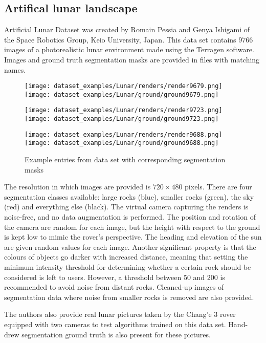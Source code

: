 \documentclass[a4paper,twoside,12pt]{book}
\begin{document}
\subsection{Artifical lunar landscape}
Artificial Lunar Dataset was created by Romain Pessia and Genya Ishigami of the Space Robotics Group, Keio University, Japan. This data set contains 9766 images of a photorealistic lunar environment made using the Terragen software. Images and ground truth segmentation masks are provided in files with matching names.

\begin{figure}[h!]
    \centering
    \texttt{[image: dataset\_examples/Lunar/renders/render9679.png]}
    \texttt{[image: dataset\_examples/Lunar/ground/ground9679.png]}

    \texttt{[image: dataset\_examples/Lunar/renders/render9723.png]}
    \texttt{[image: dataset\_examples/Lunar/ground/ground9723.png]}

    \texttt{[image: dataset\_examples/Lunar/renders/render9688.png]}
    \texttt{[image: dataset\_examples/Lunar/ground/ground9688.png]}
    \caption{Example entries from data set with corresponding segmentation masks}
    \label{fig:data_example1}
\end{figure}

The resolution in which images are provided is $720 \times 480$ pixels. There are four segmentation classes available: large rocks (blue), smaller rocks (green), the sky (red) and everything else (black). The virtual camera capturing the renders is noise-free, and no data augmentation is performed. The position and rotation of the camera are random for each image, but the height with respect to the ground is kept low to mimic the rover's perspective. The heading and elevation of the sun are given random values for each image. Another significant property is that the colours of objects go darker with increased distance, meaning that setting the minimum intensity threshold for determining whether a certain rock should be considered is left to users. However, a threshold between 50 and 200 is recommended to avoid noise from distant rocks. Cleaned-up images of segmentation data where noise from smaller rocks is removed are also provided.

The authors also provide real lunar pictures taken by the Chang'e 3 rover equipped with two cameras to test algorithms trained on this data set. Hand-drew segmentation ground truth is also present for these pictures.
\end{document}
